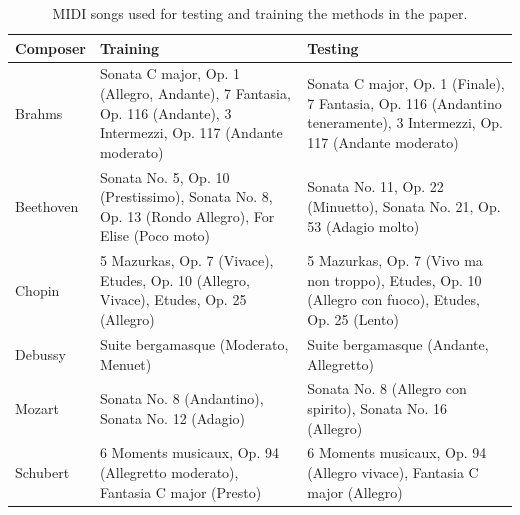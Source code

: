\documentclass[5p]{elsarticle}
\begin{document}
\begin{center}
\begin{table}[ht]
\caption{MIDI songs used for testing and training the methods in the paper.}
\begin{center}
\begin{tabular}{L{2cm} L{4cm} L{4cm}}
Composer & Training & Testing \\ \hline
Brahms &
Sonata C major, Op. 1 (Allegro, Andante), 7 Fantasia, Op. 116 (Andante), 3 Intermezzi, Op. 117 (Andante moderato)
&
Sonata C major, Op. 1 (Finale), 7 Fantasia, Op. 116 (Andantino teneramente), 3 Intermezzi, Op. 117 (Andante moderato)
\\

Beethoven & Sonata No. 5, Op. 10 (Prestissimo), Sonata No. 8, Op. 13 (Rondo Allegro), For Elise (Poco moto) & Sonata No. 11, Op. 22 (Minuetto), Sonata No. 21, Op. 53 (Adagio molto) \\

Chopin & 5 Mazurkas, Op. 7 (Vivace), Etudes, Op. 10 (Allegro, Vivace), Etudes, Op. 25 (Allegro)
& 5 Mazurkas, Op. 7 (Vivo ma non troppo), Etudes, Op. 10 (Allegro con fuoco), Etudes, Op. 25 (Lento)
\\
Debussy & Suite bergamasque (Moderato, Menuet) & Suite bergamasque (Andante, Allegretto) \\
Mozart & Sonata No. 8 (Andantino), Sonata No. 12 (Adagio)
 & Sonata No. 8 (Allegro con spirito), Sonata No. 16 (Allegro)  \\

Schubert &
6 Moments musicaux, Op. 94 (Allegretto moderato), Fantasia C major (Presto)
& 6 Moments musicaux, Op. 94 (Allegro vivace), Fantasia C major (Allegro)
\\



\end{tabular}
\end{center}
\label{table:songs}
\end{table}
\end{center}



\end{document}
